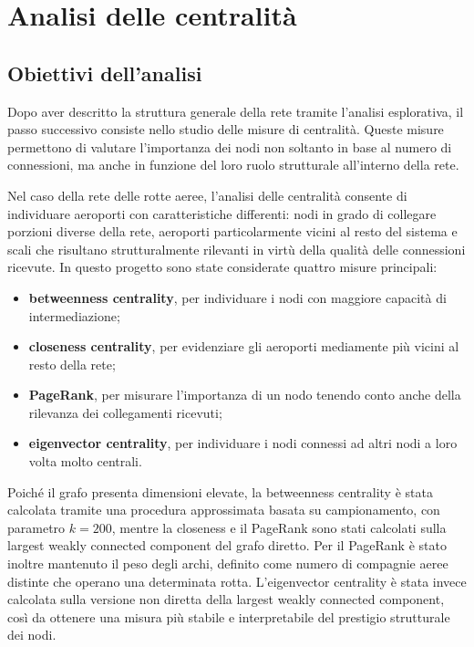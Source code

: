 \chapter{Analisi delle centralità}

\section{Obiettivi dell’analisi}

Dopo aver descritto la struttura generale della rete tramite l’analisi esplorativa, il passo successivo consiste nello studio delle misure di centralità. Queste misure permettono di valutare l’importanza dei nodi non soltanto in base al numero di connessioni, ma anche in funzione del loro ruolo strutturale all’interno della rete.

Nel caso della rete delle rotte aeree, l’analisi delle centralità consente di individuare aeroporti con caratteristiche differenti: nodi in grado di collegare porzioni diverse della rete, aeroporti particolarmente vicini al resto del sistema e scali che risultano strutturalmente rilevanti in virtù della qualità delle connessioni ricevute. In questo progetto sono state considerate quattro misure principali:
\begin{itemize}
    \item \textbf{betweenness centrality}, per individuare i nodi con maggiore capacità di intermediazione;
    \item \textbf{closeness centrality}, per evidenziare gli aeroporti mediamente più vicini al resto della rete;
    \item \textbf{PageRank}, per misurare l’importanza di un nodo tenendo conto anche della rilevanza dei collegamenti ricevuti;
    \item \textbf{eigenvector centrality}, per individuare i nodi connessi ad altri nodi a loro volta molto centrali.
\end{itemize}

Poiché il grafo presenta dimensioni elevate, la betweenness centrality è stata calcolata tramite una procedura approssimata basata su campionamento, con parametro \(k=200\), mentre la closeness e il PageRank sono stati calcolati sulla largest weakly connected component del grafo diretto. Per il PageRank è stato inoltre mantenuto il peso degli archi, definito come numero di compagnie aeree distinte che operano una determinata rotta. L’eigenvector centrality è stata invece calcolata sulla versione non diretta della largest weakly connected component, così da ottenere una misura più stabile e interpretabile del prestigio strutturale dei nodi.

